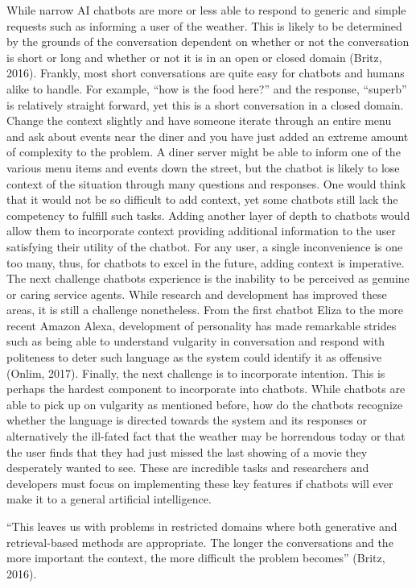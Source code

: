 \documentclass[12pt,english]{article}
\begin{document}
While narrow AI chatbots are more or less able to respond to generic and simple requests such as informing a user of the weather. This is likely to be determined by the grounds of the conversation dependent on whether or not the conversation is short or long and whether or not it is in an open or closed domain (Britz, 2016). Frankly, most short conversations are quite easy for chatbots and humans alike to handle. For example, “how is the food here?” and the response, “superb” is relatively straight forward, yet this is a short conversation in a closed domain. Change the context slightly and have someone iterate through an entire menu and ask about events near the diner and you have just added an extreme amount of complexity to the problem. A diner server might be able to inform one of the various menu items and events down the street, but the chatbot is likely to lose context of the situation through many questions and responses. One would think that it would not be so difficult to add context, yet some chatbots still lack the competency to fulfill such tasks. Adding another layer of depth to chatbots would allow them to incorporate context providing additional information to the user satisfying their utility of the chatbot. For any user, a single inconvenience is one too many, thus, for chatbots to excel in the future, adding context is imperative. The next challenge chatbots experience is the inability to be perceived as genuine or caring service agents. While research and development has improved these areas, it is still a challenge nonetheless. From the first chatbot Eliza to the more recent Amazon Alexa, development of personality has made remarkable strides such as being able to understand vulgarity in conversation and respond with politeness to deter such language as the system could identify it as offensive (Onlim, 2017). Finally, the next challenge is to incorporate intention. This is perhaps the hardest component to incorporate into chatbots. While chatbots are able to pick up on vulgarity as mentioned before, how do the chatbots recognize whether the language is directed towards the system and its responses or alternatively the ill-fated fact that the weather may be horrendous today or that the user finds that they had just missed the last showing of a movie they desperately wanted to see. These are incredible tasks and researchers and developers must focus on implementing these key features if chatbots will ever make it to a general artificial intelligence. 


“This leaves us with problems in restricted domains where both generative and retrieval-based methods are appropriate. The longer the conversations and the more important the context, the more difficult the problem becomes” (Britz, 2016).
\end{document}
